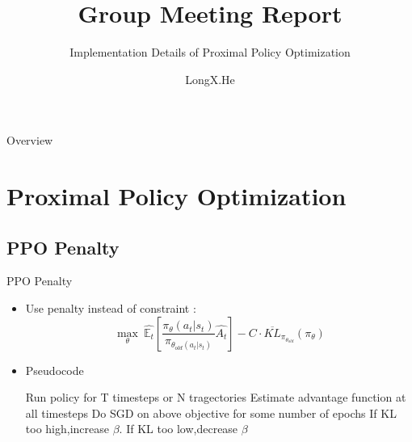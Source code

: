 \documentclass[english, xcolor=dvipsnames, aspectratio=169]{beamer}
\newcommand{\customToC}[2]
{
    \begin{frame}{Overview}
    \tableofcontents[#1,#2]
    \end{frame}
}
\begin{document}
\title{Group Meeting Report }
\subtitle{Implementation Details of Proximal Policy Optimization}
\author{LongX.He}
\relax
{}\relax
{}\relax

\frame{\titlepage}
\customToC{}{}


\section{Proximal Policy Optimization}



\subsection{PPO Penalty}
\begin{frame}{PPO Penalty}
 \begin{itemize}
        \item Use penalty instead of constraint \cite{schulman_proximal_2017}  :
                 $$ \max_{\theta} \ \hat{\mathbb{E}_{t}}\left[\frac{\pi_{\theta}(a_t|s_t)}{\pi_{\theta_{old}(a_t|s_t)}}\hat{A_t}\right]-C\cdot\overline{KL}_{\pi_{\theta_{old}}}(\pi_{\theta})
         $$
         \item Pseudocode
             \begin{algorithm}[H]  
  \caption{PPO Penalty}  
  \begin{algorithmic}[1] 
    \State Run policy for T timesteps  or N tragectories
    \State Estimate advantage function at all timesteps
    \State Do SGD on above objective for some number of epochs
    \State If KL too high,increase $\beta$. If KL too low,decrease $\beta$
    
    \EndFor   
  \end{algorithmic}  
\end{algorithm}

\end{itemize}

\end{frame}
\end{document}
